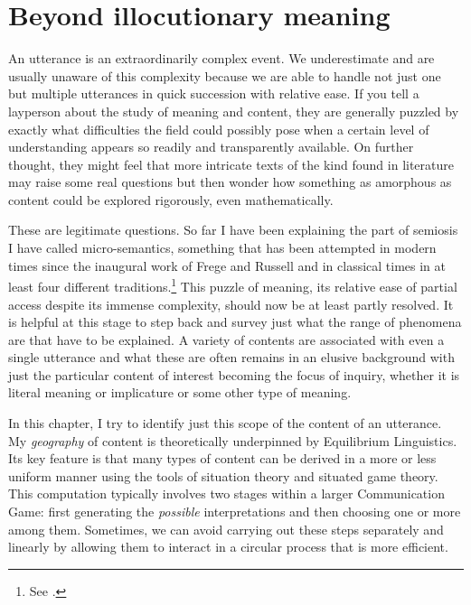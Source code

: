 \chapter{Beyond illocutionary meaning} \label{ch:beyond illocutionary meaning}

An utterance is an extraordinarily complex event. We underestimate and are usually unaware of this complexity because we are able to handle not just one but multiple utterances in quick succession with relative ease. If you tell a layperson about the study of meaning and content, they are generally puzzled by exactly what difficulties the field could possibly pose when a certain level of understanding appears so readily and transparently available. On further thought, they might feel that more intricate texts of the kind found in literature may raise some real questions but then wonder how something as amorphous as content could be explored rigorously, even mathematically.

These are legitimate questions. So far I have been explaining the part of semiosis I have called micro-semantics, something that has been attempted in modern times since the inaugural work of Frege and Russell and in classical times in at least four different traditions.\footnote{See \citet{bhsv:es}.} This puzzle of meaning, its relative ease of partial access despite its immense complexity, should now be at least partly resolved. It is helpful at this stage to step back and survey just what the range of phenomena are that have to be explained. A variety of contents are associated with even a single utterance and what these are often remains in an elusive background with just the particular content of interest becoming the focus of inquiry, whether it is literal meaning or implicature or some other type of meaning.

In this chapter, I try to identify just this scope of the content of an utterance. My \emph{geography} of content is theoretically underpinned by Equilibrium Linguistics. Its key feature is that many types of content can be derived in a more or less uniform manner using the tools of situation theory and situated game theory. This computation typically involves two stages within a larger Communication Game: first generating the \emph{possible} interpretations and then choosing one or more among them. Sometimes, we can avoid carrying out these steps separately and linearly by allowing them to interact in a circular process that is more efficient.

